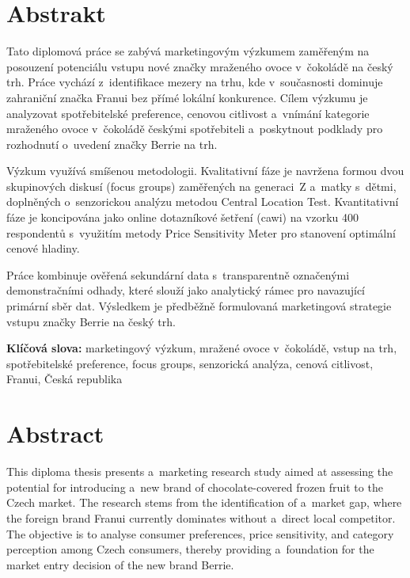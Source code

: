 \chapter*{Abstrakt}

Tato diplomová práce se zabývá marketingovým výzkumem zaměřeným na posouzení potenciálu vstupu nové značky mraženého ovoce v~čokoládě na český trh. Práce vychází z~identifikace mezery na trhu, kde v~současnosti dominuje zahraniční značka Franui bez přímé lokální konkurence. Cílem výzkumu je analyzovat spotřebitelské preference, cenovou citlivost a~vnímání kategorie mraženého ovoce v~čokoládě českými spotřebiteli a~poskytnout podklady pro rozhodnutí o~uvedení značky Berrie na trh.

Výzkum využívá smíšenou metodologii. Kvalitativní fáze je navržena formou dvou skupinových diskusí (focus groups) zaměřených na generaci~Z a~matky s~dětmi, doplněných o~senzorickou analýzu metodou Central Location Test. Kvantitativní fáze je koncipována jako online dotazníkové šetření (\gls{cawi}) na vzorku 400 respondentů s~využitím metody Price Sensitivity Meter pro stanovení optimální cenové hladiny.

Práce kombinuje ověřená sekundární data s~transparentně označenými demonstračními odhady, které slouží jako analytický rámec pro navazující primární sběr dat. Výsledkem je předběžně formulovaná marketingová strategie vstupu značky Berrie na český trh.

\vspace{5mm}
\noindent\textbf{Klíčová slova:} marketingový výzkum, mražené ovoce v~čokoládě, vstup na trh, spotřebitelské preference, focus groups, senzorická analýza, cenová citlivost, Franui, Česká republika

\newpage
\chapter*{Abstract}

This diploma thesis presents a~marketing research study aimed at assessing the potential for introducing a~new brand of chocolate-covered frozen fruit to the Czech market. The research stems from the identification of a~market gap, where the foreign brand Franui currently dominates without a~direct local competitor. The objective is to analyse consumer preferences, price sensitivity, and category perception among Czech consumers, thereby providing a~foundation for the market entry decision of the new brand Berrie.

